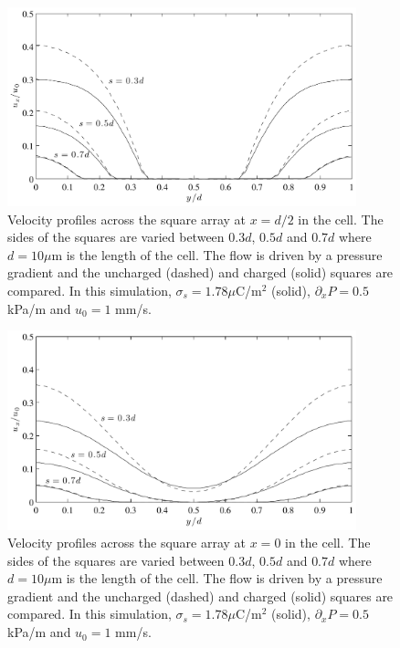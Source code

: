\begin{figure}
\begin{center}
\includegraphics[width=0.9\textwidth]{fig/square_u_mid.pdf}
\end{center}
\caption[Section of the velocity field through a square
  array.]{Velocity profiles across the square array at $x = d/2$ in
  the cell. The sides of the squares are varied between $0.3d$, $0.5d$
  and $0.7d$ where $d = 10 \mu$m is the length of the cell. The flow
  is driven by a pressure gradient and the uncharged (dashed) and
  charged (solid) squares are compared. In this simulation, $\sigma_s
  = 1.78 \mu$C/m$^2$ (solid), $\partial_xP = 0.5$ kPa/m and $u_0 = 1$
  mm/s. }
\label{fig:res:mid}
\end{figure}

\begin{figure}
\begin{center}
\includegraphics[width=0.9\textwidth]{fig/square_pre_u.pdf}
\end{center}
\caption[Section of the velocity field through a square
  array.]{Velocity profiles across the square array at $x = 0$ in the
  cell. The sides of the squares are varied between $0.3d$, $0.5d$ and
  $0.7d$ where $d = 10 \mu$m is the length of the cell. The flow is
  driven by a pressure gradient and the uncharged (dashed) and charged
  (solid) squares are compared. In this simulation, $\sigma_s = 1.78
  \mu$C/m$^2$ (solid), $\partial_xP = 0.5$ kPa/m and $u_0 = 1$ mm/s. }
\label{fig:res:pre}
\end{figure}
